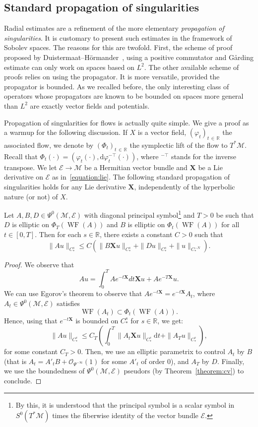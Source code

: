 \documentclass[AHL,Unicode,longabstracts,published]{cedram}
\newcommand{\R}{\mathbb{R}}
\newcommand{\X}{\mathbf{X}}
\newcommand{\mc}{\mathcal}
\newcommand{\M}{\mathcal{M}}
\newcommand{\E}{\mathcal{E}}
\newcommand{\dd}{\mathrm{d}}
\DeclareMathOperator{\WF}{WF}
\begin{document}
\subsection{Standard propagation of singularities}

Radial estimates are a refinement of the more elementary \emph{propagation of singularities}. It is customary to present such estimates in the framework of Sobolev spaces. The reasons for this are twofold. First, the scheme of proof proposed by Duistermaat--H\"ormander~\cite{Duistermaat-Hormander-72}, using a positive commutator and G{\r a}rding estimate can only work on spaces based on $L^2$. The other available scheme of proofs relies on using the propagator. It is more versatile, provided the propagator is bounded. As we recalled before, the only interesting class of operators whose propagators are known to be bounded on spaces more general than $L^2$ are exactly vector fields and potentials.

Propagation of singularities for flows is actually quite simple. We give a proof as a warmup for the following discussion. If $X$ is a vector field, $(\varphi_t)_{t\,\in\,\R}$ the associated flow, we denote by $(\Phi_t)_{t\,\in\,\R}$ the symplectic lift of the flow to $T^\ast \M$. Recall that $\Phi_t(\cdot) = (\varphi_t(\cdot), \dd \varphi_t^{-\top}(\cdot))$, where ${}^{-\top}$ stands for the inverse transpose. We let $\E \rightarrow \M$ be a Hermitian vector bundle and $\X$ be a Lie derivative on $\E$ as in~\eqref{equation:lie}. The following standard propagation of singularities holds for any Lie derivative $\X$, independently of the hyperbolic nature (or not) of $X$.

\begin{prop}\label{prop:usual-propagation-Cs}
Let $A,B,D\in \Psi^0(\M,\E)$ with diagonal principal symbol\footnote{By this, it is understood that the principal symbol is a scalar symbol in $S^0(T^*\M)$ times the fiberwise identity of the vector bundle $\E$.} and $T>0$ be such that $D$ is elliptic on $\Phi_T(\WF(A))$ and $B$ is elliptic on $\Phi_t (\WF(A))$ for all $t\in [0,T]$. Then for each $s\in \R$, there exists a constant $C>0$ such that
\[
\| A u \|_{C_*^s} \leq C \left(\| B \X u \|_{C_*^s} + \| D u \|_{C_*^s} + \|u\|_{C_*^{-N}}\right).
\]
\end{prop}

\begin{proof}
We observe that
\[
A u = \int_0^T A e^{-t\X}dt \X u + A e^{-T\X}u.
\]
We can use Egorov's theorem to observe that $A e^{-t\X} = e^{-t\X} A_t$, where $A_t\in \Psi^0(\M,\E)$ satisfies
\[
\WF(A_t)\subset \Phi_t (\WF(A)).
\]
Hence, using that $e^{-t\X}$ is bounded on $C^s_\ast$ for $s\in\R$, we get:
\[
\|Au\|_{C^s_*} \leq C_T \left(\int_0^T \|A_t \X u\|_{C^s_*} \dd t + \|A_T u\|_{C^s_*}\right),
\]
for some constant $C_T > 0$. Then, we use an elliptic parametrix to control $A_t$ by $B$ (that is $A_t = A'_t B + \mc{O}_{\Psi^{-\infty}}(1)$ for some $A'_t$ of order $0$), and $A_T$ by $D$. Finally, we use the boundedness of $\Psi^0(\M,\E)$ pseudors (by Theorem~\ref{theorem:cv}) to conclude.
\end{proof}
\end{document}
